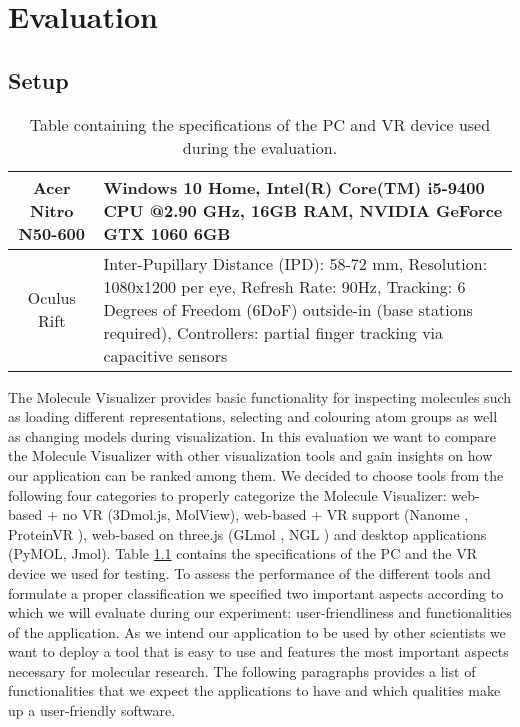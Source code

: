 %

\chapter{Evaluation}
\label{sec:evaluation}


\section{Setup}
\label{sec:evaluation:setup}

\begin{table}[h]
\begin{tabularx}{\textwidth}{ | c | X | }
\hline
Acer Nitro N50-600 & Windows 10 Home, Intel(R) Core(TM) i5-9400 CPU @2.90 GHz, 16GB RAM, NVIDIA GeForce GTX 1060 6GB \\ \hline
Oculus Rift & Inter-Pupillary Distance (IPD): 58-72 mm, Resolution: 1080x1200 per eye, Refresh Rate: 90Hz, Tracking: 6 Degrees of Freedom (6DoF) outside-in (base stations required), Controllers: partial finger tracking via capacitive sensors \\ \hline
\end{tabularx}
\caption{Table containing the specifications of the PC and VR device used during the evaluation.}
\label{sec:evaluation:setup:specstable}
\end{table}

The Molecule Visualizer provides basic functionality for inspecting molecules such as loading different representations, selecting and colouring atom groups as well as changing models during visualization. In this evaluation we want to compare the Molecule Visualizer with other visualization tools and gain insights on how our application can be ranked among them. We decided to choose tools from the following four categories to properly categorize the Molecule Visualizer: web-based + no VR (3Dmol.js, MolView), web-based + VR support (Nanome \cite{nanome}, ProteinVR \cite{10.1371/journal.pcbi.1007747}), web-based on three.js (GLmol \cite{biochem-fan2022Oct}, NGL \cite{10.1093/bioinformatics/bty419, 10.1093/nar/gkv402}) and desktop applications (PyMOL, Jmol). Table \ref{sec:evaluation:setup:specstable} contains the specifications of the PC and the VR device we used for testing. To assess the performance of the different tools and formulate a proper classification we specified two important aspects according to which we will evaluate during our experiment: user-friendliness and functionalities of the application. As we intend our application to be used by other scientists we want to deploy a tool that is easy to use and features the most important aspects necessary for molecular research. The following paragraphs provides a list of functionalities that we expect the applications to have and which qualities make up a user-friendly software.


